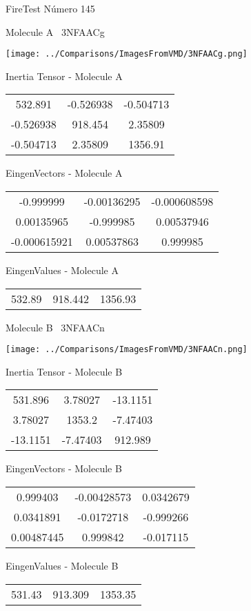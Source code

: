\vtab[-3cm]
\begin{center}
{\large FireTest \tab Número 145}
\end{center}
\begin{multicols}{2}
\begin{center}

Molecule A \
3NFAACg

\texttt{[image: ../Comparisons/ImagesFromVMD/3NFAACg.png]}

Inertia Tensor - Molecule A \\
\begin{tabular}{|c c c|}
532.891	 & 	-0.526938	 & 	-0.504713	 \\
-0.526938	 & 	918.454	 & 	2.35809	 \\
-0.504713	 & 	2.35809	 & 	1356.91
\end{tabular}

\vtab
 EingenVectors - Molecule A     \\
\begin{tabular}{|c c c|}
-0.999999	 & 	-0.00136295	 & 	-0.000608598	 \\
0.00135965	 & 	-0.999985	 & 	0.00537946	 \\
-0.000615921	 & 	0.00537863	 & 	0.999985
\end{tabular}

\vtab
 EingenValues - Molecule A     \\
\begin{tabular}{|c c c|}
532.89	 & 	918.442	 & 	1356.93	 \\
\end{tabular}
\columnbreak

Molecule B \
3NFAACn

\texttt{[image: ../Comparisons/ImagesFromVMD/3NFAACn.png]}

Inertia Tensor - Molecule B \\
\begin{tabular}{|c c c|}
531.896	 & 	3.78027	 & 	-13.1151	 \\
3.78027	 & 	1353.2	 & 	-7.47403	 \\
-13.1151	 & 	-7.47403	 & 	912.989
\end{tabular}

\vtab
 EingenVectors - Molecule B     \\
\begin{tabular}{|c c c|}
0.999403	 & 	-0.00428573	 & 	0.0342679	 \\
0.0341891	 & 	-0.0172718	 & 	-0.999266	 \\
0.00487445	 & 	0.999842	 & 	-0.017115
\end{tabular}

\vtab
 EingenValues - Molecule B     \\
\begin{tabular}{|c c c|}
531.43	 & 	913.309	 & 	1353.35	 \\
\end{tabular}

\end{center}
\end{multicols}

